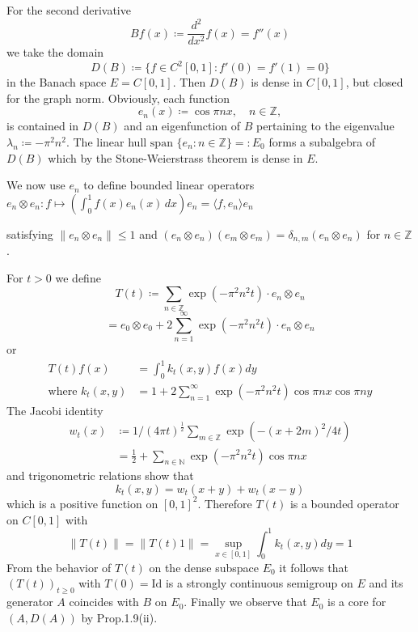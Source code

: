 For the second derivative 
\[
    Bf(x) \coloneqq \frac{d^{2}}{dx^{2}}f(x) = f''(x)
\]
we take the domain
\[
    D(B) \coloneqq \{f \in C^{2}[0,1] : f'(0) = f'(1) = 0\}
\]
in the Banach space $E = C[0,1]$.
Then $D(B)$ is dense in $C[0,1]$, but closed for the graph norm.
Obviously, each function
\[
    e_{n}(x) \coloneqq \cos \pi nx, \quad n \in \mathbb{Z},
\]
is contained in $D(B)$ and an eigenfunction of $B$ pertaining to the eigenvalue $\lambda_{n} \coloneqq -\pi^{2}n^{2}$.
The linear hull $\text{span }\{e_{n} : n \in \mathbb{Z}\} =: E_{0}$ forms a subalgebra of $D(B)$ which by the Stone-Weierstrass theorem is dense in $E$.

We now use $e_{n}$ to define bounded linear operators $e_{n} \otimes e_{n} : f \mapsto (\int_{0}^{1} f(x)e_{n}(x) \, dx)e_{n} = \langle f,e_{n}\rangle e_{n}$

\newpage

satisfying $\|e_{n} \otimes e_{n}\| \leq 1$ and
$(e_{n} \otimes e_{n})(e_{m} \otimes e_{m}) = \delta_{n,m}(e_{n} \otimes e_{n})$ for $n \in \mathbb{Z}$.

For $t > 0$ we define
\[
    T(t) \coloneqq \sum_{n \in \mathbb{Z}} \exp(-\pi^{2}n^{2}t) \cdot e_{n} \otimes e_{n}
\]
\[
    = e_{0} \otimes e_{0} + 2\sum_{n=1}^{\infty} \exp(-\pi^{2}n^{2}t) \cdot e_{n} \otimes e_{n}
\]
or
\begin{align*}
    T(t)f(x) &= \int_{0}^{1} k_{t}(x,y)f(x)dy \\
    \text{where } k_{t}(x,y) &= 1 + 2\sum_{n=1}^{\infty} \exp(-\pi^{2}n^{2}t) \cos\pi nx \cos\pi ny
\end{align*}
The Jacobi identity
\begin{align*}
    w_{t}(x) &\coloneqq 1/(4\pi t)^{\frac{1}{2}} \sum_{m \in \mathbb{Z}} \exp(-(x+2m)^{2}/4t) \\
    &= \frac{1}{2} + \sum_{n \in \mathbb{N}} \exp(-\pi^{2}n^{2}t) \cos\pi nx
\end{align*}
and trigonometric relations show that
\[
    k_{t}(x,y) = w_{t}(x+y) + w_{t}(x-y)
\]
which is a positive function on $[0,1]^{2}$.
Therefore $T(t)$ is a bounded operator on $C[0,1]$ with
\[
    \|T(t)\| = \|T(t)1\| = \sup_{x \in [0,1]} \int_{0}^{1} k_{t}(x,y)dy = 1
\]
From the behavior of $T(t)$ on the dense subspace $E_{0}$ it follows that $(T(t))_{t \geq 0}$ with $T(0) = \text{Id}$ is a strongly continuous semigroup on $E$ and its generator $A$ coincides with $B$ on $E_{0}$.
Finally we observe that $E_{0}$ is a core for $(A,D(A))$ by Prop.1.9(ii).

